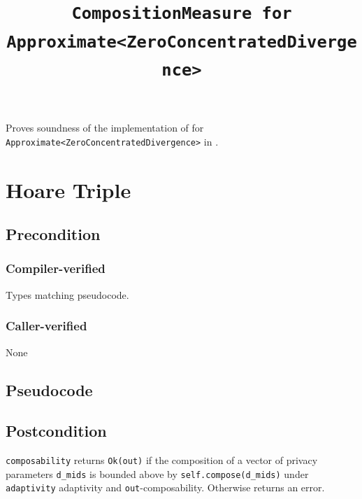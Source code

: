 \documentclass{article}
\title{\texttt{CompositionMeasure for Approximate<ZeroConcentratedDivergence>}}
\author{\MichaelShoemateAuthor}
\date{}
\begin{document}
\maketitle

\contrib
Proves soundness of the implementation of 
for \texttt{Approximate<ZeroConcentratedDivergence>} in .

\section{Hoare Triple}
\subsection*{Precondition}
\subsubsection*{Compiler-verified}
Types matching pseudocode.


\subsubsection*{Caller-verified}
None

\subsection*{Pseudocode}


\subsection*{Postcondition}
\begin{theorem}
  \texttt{composability} returns \texttt{Ok(out)} if the composition of a vector of privacy parameters \texttt{d\_mids}
  is bounded above by \texttt{self.compose(d\_mids)} under \texttt{adaptivity} adaptivity and \texttt{out}-composability.
  Otherwise returns an error.
\end{theorem}
\end{document}
